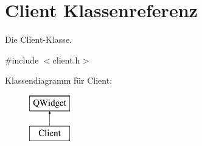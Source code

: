 \hypertarget{class_client}{}\section{Client Klassenreferenz}
\label{class_client}


Die Client-\/\+Klasse.  




{\ttfamily \#include $<$client.\+h$>$}

Klassendiagramm für Client\+:\begin{figure}[H]
\begin{center}
\leavevmode
\includegraphics[height=2.000000cm]{class_client}
\end{center}
\end{figure}
